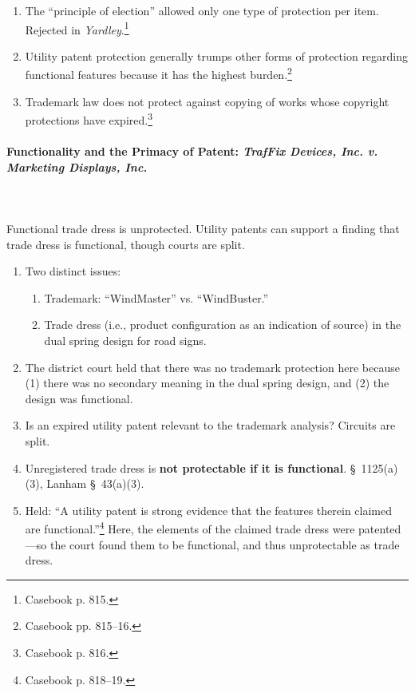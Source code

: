 \begin{enumerate}
    \item The ``principle of election'' allowed only one type of protection 
    per item. Rejected in \emph{Yardley}.\footnote{Casebook p. 815.}
    \item Utility patent protection generally trumps other forms of protection 
    regarding functional features because it has the highest 
    burden.\footnote{Casebook pp. 815--16.}
    \item Trademark law does not protect against copying of works whose 
    copyright protections have expired.\footnote{Casebook p. 816.}
\end{enumerate}

\paragraph{Functionality and the Primacy of Patent: \emph{TrafFix Devices, 
Inc. v. Marketing Displays, Inc.}}
~\\\\
Functional trade dress is unprotected. Utility patents can support a finding 
that trade dress is functional, though courts are split.

\begin{enumerate}
    \item Two distinct issues:
    \begin{enumerate}
        \item Trademark: ``WindMaster'' vs. ``WindBuster.''
        \item Trade dress (i.e., product configuration as an indication of 
        source) in the dual spring design for road signs.
    \end{enumerate}
    \item The district court held that there was no trademark protection here 
    because (1) there was no secondary meaning in the dual spring design, and 
    (2) the design was functional.
    \item Is an expired utility patent relevant to the trademark analysis? 
    Circuits are split.
    \item Unregistered trade dress is \textbf{not protectable if it is 
    functional}. \S\ 1125(a)(3), Lanham \S\ 43(a)(3).
    \item Held: ``A utility patent is strong evidence that the features 
    therein claimed are functional.''\footnote{Casebook p. 818--19.} Here, the 
    elements of the claimed trade dress were patented---so the court found 
    them to be functional, and thus unprotectable as trade dress.
\end{enumerate}

